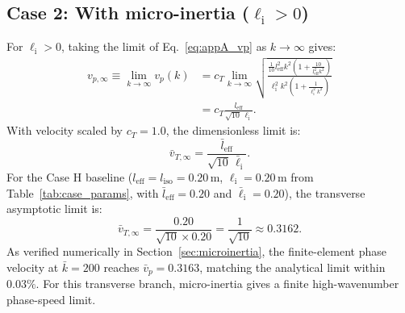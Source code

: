 \subsection{Case 2: With micro-inertia ($\ell_{\mathrm{i}} > 0$)}
For $\ell_{\mathrm{i}} > 0$, taking the limit of Eq.~\eqref{eq:appA_vp} as $k \to \infty$ gives:
\begin{equation}
\begin{split}
v_{p,\infty} \equiv \lim_{k \to \infty} v_p(k)
&= c_T \lim_{k \to \infty} \sqrt{\frac{\frac{1}{10} l_{\mathrm{eff}}^2 k^2 (1 + \frac{10}{l_{\mathrm{eff}}^2 k^2})}{\ell_{\mathrm{i}}^2 k^2 (1 + \frac{1}{\ell_{\mathrm{i}}^2 k^2})}} \\
&= c_T \frac{l_{\mathrm{eff}}}{\sqrt{10}\,\ell_{\mathrm{i}}}.
\end{split}
\label{eq:appA_vp_bounded}
\end{equation}
With velocity scaled by $c_T = 1.0$, the dimensionless limit is:
\begin{equation}
\bar{v}_{T,\infty} = \frac{\bar{l}_{\mathrm{eff}}}{\sqrt{10}\,\bar{\ell}_{\mathrm{i}}}.
\label{eq:appA_v_horizon}
\end{equation}
For the Case H baseline ($l_{\mathrm{eff}} = l_{\mathrm{iso}} = 0.20\,\mathrm{m}$, $\ell_{\mathrm{i}} = 0.20\,\mathrm{m}$ from Table~\ref{tab:case_params}, with $\bar{l}_{\mathrm{eff}} = 0.20$ and $\bar{\ell}_{\mathrm{i}} = 0.20$), the transverse asymptotic limit is:
\begin{equation}
\bar{v}_{T,\infty} = \frac{0.20}{\sqrt{10} \times 0.20} = \frac{1}{\sqrt{10}} \approx 0.3162.
\label{eq:appA_horizon_val}
\end{equation}
As verified numerically in Section~\ref{sec:microinertia}, the finite-element phase velocity at $\bar{k} = 200$ reaches $\bar{v}_p = 0.3163$, matching the analytical limit within $0.03\%$. For this transverse branch, micro-inertia gives a finite high-wavenumber phase-speed limit.
